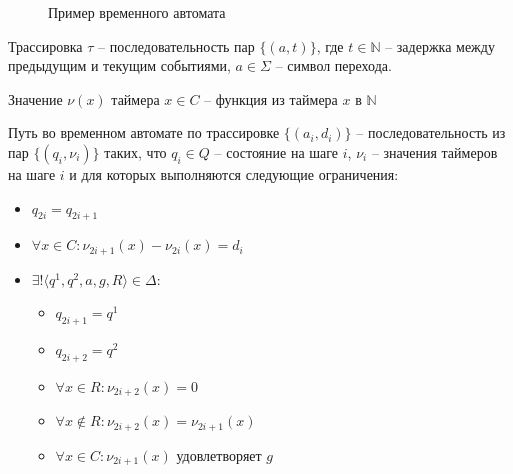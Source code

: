 \documentclass[times,specification,annotation]{itmo-student-thesis}
\begin{document}
\begin{figure}[!h]
\caption{Пример временного автомата}\label{time_automaton}
\centering
{}
\end{figure}

\begin{definition}
  Трассировка $\tau$ -- последовательность пар $\{\left( a, t \right)\}$, 
  где $t \in \mathbb{N}$ -- задержка между предыдущим и текущим событиями, $a \in \Sigma$ -- символ перехода.
\end{definition}

\begin{definition}
  Значение $\nu(x)$ таймера $x \in C$ -- функция из таймера $x$ в $\mathbb{N}$
\end{definition}

\begin{definition}
  Путь во временном автомате по трассировке $\{\left( a_i, d_i \right)\}$ -- последовательность из пар $\{\left( q_i, \nu_i \right)\}$ таких, 
  что $q_i \in Q$ -- состояние на шаге $i$, $\nu_i$ -- значения таймеров на шаге $i$ и для которых выполняются следующие ограничения:
  \begin{itemize}
    \item $q_{2i} = q_{2i+1}$
    \item $\forall x \in C: \nu_{2i+1}(x) - \nu_{2i}(x) = d_i$
    \item $\exists! \langle q^1, q^2, a, g, R \rangle \in \Delta$: 
      \begin{itemize}
	\item $q_{2i+1} = q^1$
	\item $q_{2i+2} = q^2$
        \item $\forall x \in R: \nu_{2i+2}(x) = 0$
	\item $\forall x \not\in R: \nu_{2i+2}(x) = \nu_{2i+1}(x)$
	\item $\forall x \in C: \nu_{2i+1}(x)$ удовлетворяет $g$
      \end{itemize}
  \end{itemize}
\end{definition}
\end{document}
